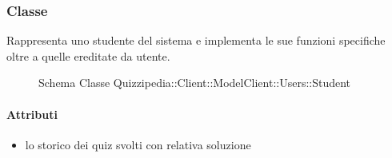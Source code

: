 \subsubsection{Classe }
Rappresenta uno studente del sistema e implementa le sue funzioni specifiche oltre a quelle ereditate da utente.
\begin{figure}[H]
\centering
\noindent{}
\caption[Schema Classe Student]{Schema Classe Quizzipedia::Client::ModelClient::Users::Student}
\end{figure}
\paragraph{Attributi}
\begin{itemize}
\item {}
\newline
lo storico dei quiz svolti con relativa soluzione
\end{itemize}
